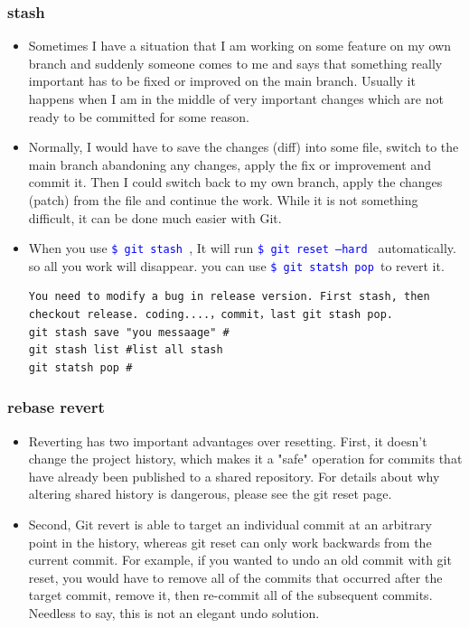 \documentclass[a4paper,12pt,twoside]{book}
\newcommand{\linuxcommand}[1]{\texttt{\textcolor{blue}{\$ #1 \Pisymbol{psy}{191}}}}
\begin{document}
\begin{itemize}
\subsubsection{stash}
\begin{itemize}
		\item Sometimes I have a situation that I am working on some feature on my own branch and suddenly someone comes to me and says that something really important has to be fixed or improved on the main branch. Usually it happens when I am in the middle of very important changes which are not ready to be committed for some reason. 

\item Normally, I would have to save the changes (diff) into some file, switch to the main branch abandoning any changes, apply the fix or improvement and commit it. Then I could switch back to my own branch, apply the changes (patch) from the file and continue the work. While it is not something difficult, it can be done much easier with Git.

\item When you use \linuxcommand{git stash}, It will run \linuxcommand{git reset --hard} automatically. so all you work will disappear. you can use \linuxcommand{git statsh pop }to revert it.

\begin{verbatim}
You need to modify a bug in release version. First stash, then checkout release. coding....，commit，last git stash pop.
git stash save "you messaage" #
git stash list #list all stash
git statsh pop #
\end{verbatim}

\end{itemize}

\subsubsection{rebase revert}
\begin{itemize}

\item Reverting has two important advantages over resetting. First, it doesn't change the project history, which makes it a "safe" operation for commits that have already been published to a shared repository. For details about why altering shared history is dangerous, please see the git reset page.

\item Second, Git revert is able to target an individual commit at an arbitrary point in the history, whereas git reset can only work backwards from the current commit. For example, if you wanted to undo an old commit with git reset, you would have to remove all of the commits that occurred after the target commit, remove it, then re-commit all of the subsequent commits. Needless to say, this is not an elegant undo solution.


\end{itemize}
\end{itemize}
\end{document}

